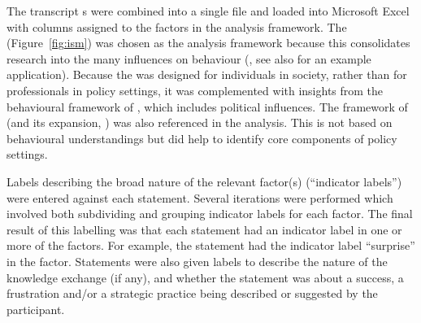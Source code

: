 The transcript \CSV s were combined into a single \CSV{} file and loaded into Microsoft Excel with columns assigned to the factors in the analysis framework. The \ISM{} (Figure~\ref{fig:ism}) was chosen as the analysis framework because this consolidates research into the many influences on behaviour (\cite{DarntonH2013}, see also \cite{MinamitaniDOI2024} for an example application). Because the \ISM{} was designed for individuals in society, rather than for professionals in policy settings, it was complemented with insights from the behavioural framework of \textcite{HamptonW2023}, which includes political influences. The framework of \textcite{BuseMW2012} (and its expansion, \cite{HaynesDCRHGS2011}) was also referenced in the analysis. This is not based on behavioural understandings but did help to identify core components of policy settings.

Labels describing the broad nature of the relevant factor(s) (``indicator labels'') were entered against each statement. Several iterations were performed which involved both subdividing and grouping indicator labels for each factor. The final result of this labelling was that each statement had an indicator label in one or more of the \ISM{} factors. For example, the statement  had the indicator label ``surprise'' in the \ismie{} factor. Statements were also given labels to describe the nature of the knowledge exchange (if any), and whether the statement was about a success, a frustration and/or a strategic practice being described or suggested by the participant.




